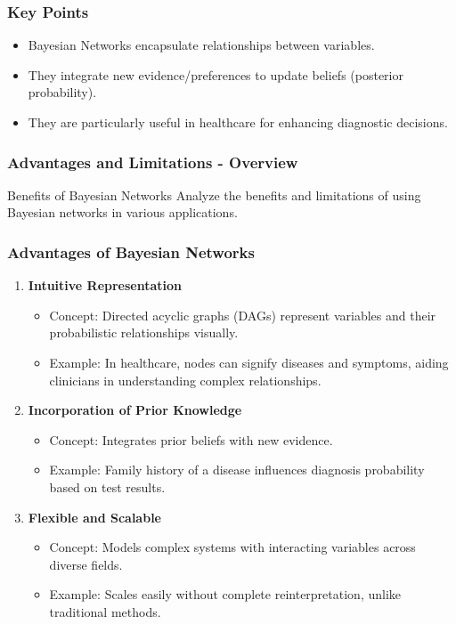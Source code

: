 \documentclass[aspectratio=169]{beamer}
\begin{document}
\begin{frame}[fragile]
  \frametitle{Key Points}
  \begin{itemize}
    \item Bayesian Networks encapsulate relationships between variables.
    \item They integrate new evidence/preferences to update beliefs (posterior probability).
    \item They are particularly useful in healthcare for enhancing diagnostic decisions.
  \end{itemize}
\end{frame}

\begin{frame}[fragile]
    \frametitle{Advantages and Limitations - Overview}
    \begin{block}{Benefits of Bayesian Networks}
        Analyze the benefits and limitations of using Bayesian networks in various applications.
    \end{block}
\end{frame}

\begin{frame}[fragile]
    \frametitle{Advantages of Bayesian Networks}
    \begin{enumerate}
        \item \textbf{Intuitive Representation}
            \begin{itemize}
                \item Concept: Directed acyclic graphs (DAGs) represent variables and their probabilistic relationships visually.
                \item Example: In healthcare, nodes can signify diseases and symptoms, aiding clinicians in understanding complex relationships.
            \end{itemize}
        \item \textbf{Incorporation of Prior Knowledge}
            \begin{itemize}
                \item Concept: Integrates prior beliefs with new evidence.
                \item Example: Family history of a disease influences diagnosis probability based on test results.
            \end{itemize}
        \item \textbf{Flexible and Scalable}
            \begin{itemize}
                \item Concept: Models complex systems with interacting variables across diverse fields.
                \item Example: Scales easily without complete reinterpretation, unlike traditional methods.
            \end{itemize}
    \end{enumerate}
\end{frame}
\end{document}
